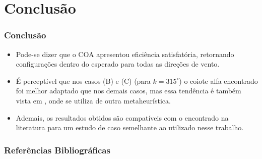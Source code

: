 \documentclass{beamer}
\begin{document}
	\section{Conclusão}
	\begin{frame}
		\frametitle{Conclusão}
		\begin{itemize}
			\item Pode-se dizer que o COA apresentou eficiência satisfatória, retornando configurações dentro do esperado para todas as direções de vento.
			\item  É perceptível que nos casos (B) e (C) (para $ k = 315^{\circ} $) o coiote alfa encontrado foi melhor adaptado que nos demais casos, mas essa tendência é também vista em \cite{FredericoFerreiraPanoeiro2018}, onde se utiliza de outra metaheurística.
			\item Ademais, os resultados obtidos são compatíveis com o encontrado na literatura \cite{FredericoFerreiraPanoeiro2018} para um estudo de caso semelhante ao utilizado nesse trabalho.
		\end{itemize}
	\end{frame}

	\begin{frame}[allowframebreaks]
		\frametitle{Referências Bibliográficas}
		\printbibliography[
		title={REFERÊNCIAS BIBLIOGRÁFICAS}
		]
	\end{frame}
\end{document}
